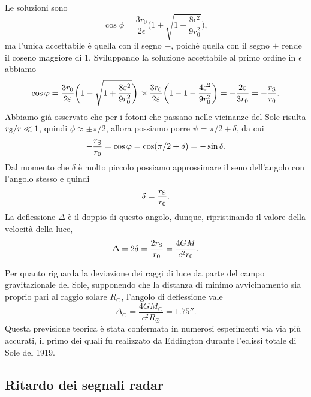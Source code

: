 Le soluzioni sono
\begin{equation}
  \cos\phi = \frac{3r_{0}}{2\epsilon}\bigg(1 \pm \sqrt{1 +
    \frac{8\epsilon^{2}}{9r_{0}^{2}}}\bigg),
\end{equation}
ma l'unica accettabile è quella con il segno $-$, poiché quella con il segno $+$
rende il coseno maggiore di $1$.  Sviluppando la soluzione accettabile al primo
ordine in $\epsilon$ abbiamo
\begin{equation}
  \cos\phi = \frac{3r_{0}}{2\epsilon}\bigg(1 - \sqrt{1 +
    \frac{8\epsilon^{2}}{9r_{0}^{2}}}\bigg) \approx \frac{3r_{0}}{2\epsilon}\bigg(1 - 1 -
  \frac{4\epsilon^{2}}{9r_{0}^{2}}\bigg) = -\frac{2\epsilon}{3r_{0}} =
  -\frac{r_{\textup{S}}}{r_{0}}.
\end{equation}
Abbiamo già osservato che per i fotoni che passano nelle vicinanze del Sole
risulta $r_{\textup{S}}/r \ll 1$, quindi $\phi \approx \pm \pi/2$, allora
possiamo porre $\psi = \pi/2 + \delta$, da cui
\begin{equation}
  -\frac{r_{\textup{S}}}{r_{0}} = \cos\phi = \cos(\pi/2 + \delta) = -\sin\delta.
\end{equation}
Dal momento che $\delta$ è molto piccolo possiamo approssimare il seno
dell'angolo con l'angolo stesso e quindi
\begin{equation}
  \delta = \frac{r_{\textup{S}}}{r_{0}}.
\end{equation}
La deflessione $\Delta$ è il doppio di questo angolo, dunque, ripristinando il
valore della velocità della luce,
\begin{equation}
  \Delta = 2\delta = \frac{2r_{\textup{S}}}{r_{0}} = \frac{4GM}{c^{2}r_{0}}.
\end{equation}

Per quanto riguarda la deviazione dei raggi di luce da parte del campo
gravitazionale del Sole, supponendo che la distanza di minimo avvicinamento sia
proprio pari al raggio solare $R_{\odot}$, l'angolo di deflessione vale
\begin{equation}
  \Delta_{\odot} = \frac{4GM_{\odot}}{c^{2}R_{\odot}} = \ang{;;1.75}.
\end{equation}
Questa previsione teorica è stata confermata in numerosi esperimenti via via più
accurati, il primo dei quali fu realizzato da Eddington durante l'eclissi totale
di Sole del 1919.

\subsection{Ritardo dei segnali radar}
\label{sec:ritardo-radar}

